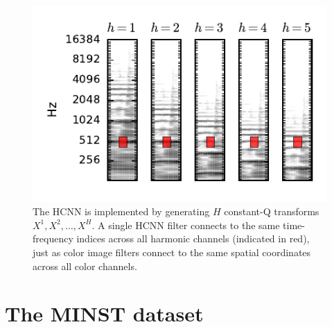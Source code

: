 \documentclass{article}
\begin{document}
\begin{figure}
    \includegraphics[width=\columnwidth]{figs/hcnn}
    \caption{The HCNN is implemented by generating $H$ constant-Q transforms $X^1, X^2, \ldots, X^H$.
    A single HCNN filter connects to the same time-frequency indices across all harmonic channels (indicated in red), just as color image filters connect to the same spatial coordinates across all color channels.}
\label{fig:hcnn}
\end{figure}

\section{The MINST dataset}




\label{minst}
\end{document}
